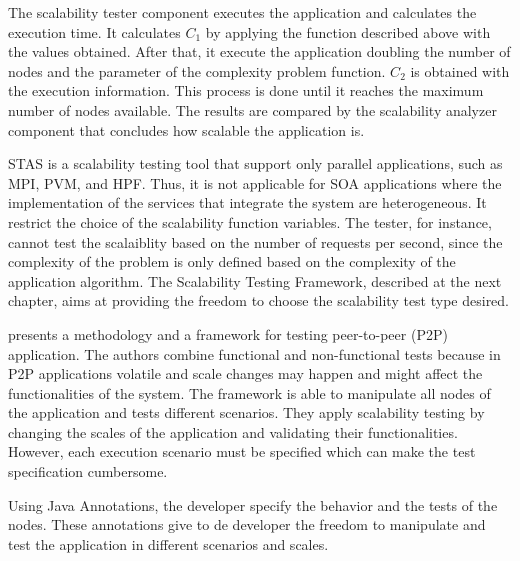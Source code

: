 The scalability tester component executes the application and calculates the execution time.  It calculates $C_1$ by applying the function described above with the values obtained. After that, it execute the application doubling the number of nodes and the parameter of the complexity problem function. $C_2$ is obtained with the execution information. This process is done until it reaches the maximum number of nodes available. The results are compared by the scalability analyzer component that concludes how scalable the application is.

STAS is a scalability testing tool that support only parallel applications, such as MPI, PVM, and HPF. Thus, it is not applicable for SOA applications where the implementation of the services that integrate the system are heterogeneous. It restrict the choice of the scalability function variables. The tester, for instance, cannot test the scalaiblity based on the number of requests per second, since the complexity of the problem is only defined based on the complexity of the application algorithm. The Scalability Testing Framework, described at the next chapter, aims at providing the freedom to choose the scalability test type desired.

\cite{p2p} presents a methodology and a framework for testing peer-to-peer (P2P) application. The authors combine functional and non-functional tests because in P2P applications volatile and scale changes may happen and might affect the functionalities of the system. The framework is able to manipulate all nodes of the application and tests different scenarios. They apply scalability testing by changing the scales of the application and validating their functionalities. However, each execution scenario must be specified which can make the test specification cumbersome.

Using Java Annotations, the developer specify the behavior and the tests of the nodes. These annotations give to de developer the freedom to manipulate and test the application in different scenarios and scales.










